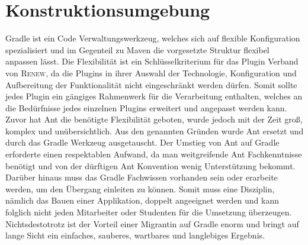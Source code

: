 \section{Konstruktionsumgebung}
Gradle ist ein Code Verwaltungswerkzeug, welches sich auf flexible Konfiguration spezialisiert und im Gegenteil zu Maven die vorgesetzte Struktur flexibel anpassen lässt. Die Flexibilität ist ein Schlüsselkriterium für das Plugin Verband von \textsc{Renew}, da die Plugins in ihrer Auswahl der Technologie, Konfiguration und Aufbereitung der Funktionalität nicht eingeschränkt werden dürfen. Somit sollte jedes Plugin ein gängiges Rahmenwerk für die Verarbeitung enthalten, welches an die Bedürfnisse jedes einzelnen Plugins erweitert und angepasst werden kann. Zuvor hat Ant die benötigte Flexibilität geboten, wurde jedoch mit der Zeit groß, komplex und unübersichtlich. Aus den genannten Gründen wurde Ant ersetzt und durch das Gradle Werkzeug ausgetauscht.\newline
Der Umstieg von Ant auf Gradle erforderte einen respektablen Aufwand, da man weitgreifende Ant Fachkenntnisse benötigt und von der dürftigen Ant Konvention wenig Unterstützung bekommt. Darüber hinaus muss das Gradle Fachwissen vorhanden sein oder erarbeite werden, um den Übergang einleiten zu können. Somit muss eine Disziplin, nämlich das Bauen einer Applikation, doppelt angeeignet werden und kann folglich nicht jeden Mitarbeiter oder Studenten für die Umsetzung überzeugen. Nichtsdestotrotz ist der Vorteil einer Migrantin auf Gradle enorm und bringt auf lange Sicht ein einfaches, sauberes, wartbares und langlebiges Ergebnis. \bigbreak

